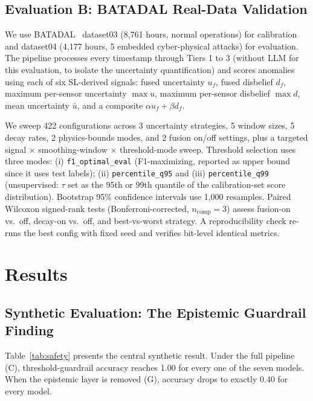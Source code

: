 \documentclass[conference]{IEEEtran}
\begin{document}
\subsection{Evaluation B: BATADAL Real-Data Validation}

We use BATADAL~\cite{taormina2018battle} dataset03 (8{,}761 hours, normal operations) for calibration and dataset04 (4{,}177 hours, 5 embedded cyber-physical attacks) for evaluation. The pipeline processes every timestamp through Tiers 1 to 3 (without LLM for this evaluation, to isolate the uncertainty quantification) and scores anomalies using each of six SL-derived signals: fused uncertainty $u_f$, fused disbelief $d_f$, maximum per-sensor uncertainty $\max u$, maximum per-sensor disbelief $\max d$, mean uncertainty $\bar{u}$, and a composite $\alpha u_f + \beta d_f$.

We sweep 422 configurations across 3 uncertainty strategies, 5 window sizes, 5 decay rates, 2 physics-bounds modes, and 2 fusion on/off settings, plus a targeted signal $\times$ smoothing-window $\times$ threshold-mode sweep. Threshold selection uses three modes: (i) \texttt{f1\_optimal\_eval} (F1-maximizing, reported as upper bound since it uses test labels); (ii) \texttt{percentile\_q95} and (iii) \texttt{percentile\_q99} (unsupervised: $\tau$ set as the 95th or 99th quantile of the calibration-set score distribution). Bootstrap 95\% confidence intervals use 1{,}000 resamples. Paired Wilcoxon signed-rank tests (Bonferroni-corrected, $n_{\text{comp}}=3$) assess fusion-on vs.\ off, decay-on vs.\ off, and best-vs-worst strategy. A reproducibility check re-runs the best config with fixed seed and verifies bit-level identical metrics.

\section{Results}
\label{sec:results}

\subsection{Synthetic Evaluation: The Epistemic Guardrail Finding}

Table~\ref{tab:safety} presents the central synthetic result. Under the full pipeline (C), threshold-guardrail accuracy reaches 1.00 for every one of the seven models. When the epistemic layer is removed (G), accuracy drops to exactly 0.40 for every model.
\end{document}
